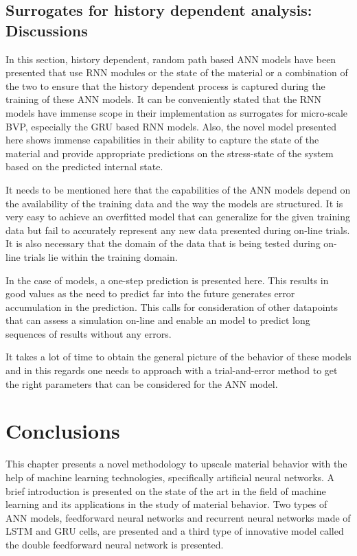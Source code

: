 \subsection{Surrogates for history dependent analysis: Discussions}
In this section, history dependent, random path based ANN models have been presented that use RNN modules or the state of the material or a combination of the two to ensure that the history dependent process is captured during the training of these ANN models. It can be conveniently stated that the RNN models have immense scope in their implementation as surrogates for micro-scale BVP, especially the GRU based RNN models. Also, the novel \fnn model presented here shows immense capabilities in their ability to capture the state of the material and provide appropriate predictions on the stress-state of the system based on the predicted internal state.

It needs to be mentioned here that the capabilities of the ANN models depend on the availability of the training data and the way the models are structured. It is very easy to achieve an overfitted model that can generalize for the given training data but fail to accurately represent any new data presented during on-line trials. It is also necessary that the domain of the data that is being tested during on-line trials lie within the training domain. 

In the case of \fnn models, a one-step prediction is presented here. This results in good values as the need to predict far into the future generates error accumulation in the prediction. This calls for consideration of other datapoints that can assess a simulation on-line and enable an \fnn model to predict long sequences of results without any errors.

It takes a lot of time to obtain the general picture of the behavior of these models and in this regards one needs to approach with a trial-and-error method to get the right parameters that can be considered for the ANN model. 

\section{Conclusions}

This chapter presents a novel methodology to upscale material behavior with the help of machine learning technologies, specifically artificial neural networks. A  brief introduction is presented on the state of the art in the field of machine learning and its applications in the study of material behavior. Two types of ANN models, feedforward neural networks and recurrent neural networks made of LSTM and GRU cells, are presented and a third type of innovative model called the double feedforward neural network is presented. 

